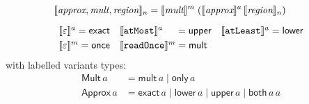 \begin{align*}
\setlength{\arraycolsep}{0.7em}
& \interp{\textit{approx}, \textit{mult}, \textit{region}}_n
= \interp{\textit{mult}}^m \; (\interp{\textit{approx}}^a \,
\interp{\textit{region}}_n) \\[0.5em]
& \begin{array}{lll}
\interp{\varepsilon}^{a}   = \textsf{exact} &
\interp{\term{atMost}}^{a} \hspace{1.3em} = \textsf{upper} &
\interp{\term{atLeast}}^{a} = \textsf{lower} \\[0.3em]
\interp{\varepsilon}^{m} = \textsf{once}
& \interp{\term{readOnce}}^{m} = \textsf{mult} &
\end{array}\\
\end{align*}
%
with labelled variants types:
%
\begin{align*}
\textsf{Mult} \, a & = \textsf{mult} \, a \mid \textsf{only} \, a \\
\textsf{Approx} \, a & = \textsf{exact} \, a \mid \textsf{lower} \, a \mid
\textsf{upper} \, a \mid \textsf{both} \, a \, a
\end{align*}


